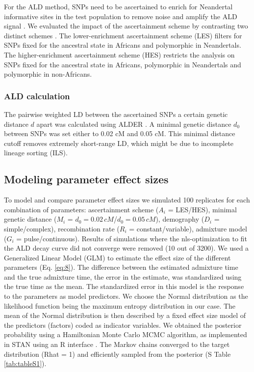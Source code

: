 \documentclass[]{article}
\begin{document}
For the ALD method, SNPs need to be ascertained to enrich for
Neandertal informative sites in the test population to remove noise and
amplify the ALD signal \citep{sankararaman_date_2012}. 
We evaluated the impact of the ascertainment scheme by contrasting two distinct schemes \citep{sankararaman_date_2012,fu_genome_2014}. The lower-enrichment
ascertainment scheme (LES) filters for SNPs fixed for the ancestral state in
Africans and polymorphic in Neandertals. The higher-enrichment
ascertainment scheme (HES) restricts the analysis on SNPs fixed for the
ancestral state in Africans, polymorphic in Neandertals and polymorphic
in non-Africans.

\subsubsection{ALD calculation}\label{ALD calculation}

The pairwise weighted LD between the ascertained SNPs a certain genetic
distance \(d\) apart was calculated using ALDER
\citep{loh_inferring_2013}. A minimal genetic distance \(d_0\) between
SNPs was set either to 0.02 cM and 0.05 cM. This minimal distance cutoff
removes extremely short-range LD, which might be due to incomplete lineage sorting (ILS). 


\subsection{Modeling parameter effect sizes}\label{modeling prameter effect sizes}

To model and compare parameter effect sizes we simulated 100
replicates for each combination of
parameters: ascertainment scheme ($A_i$ = LES/HES), minimal genetic distance
($M_i$ = \(d_{0}=0.02\,cM\)/\(d_{0}=0.05\,cM\)), demography ($D_i$ = simple/complex),
recombination rate ($R_i$ = constant/variable), admixture model
($G_i$ = pulse/continuous). Results of simulations where the nls-optimization to
fit the ALD decay curve did not converge were removed (10 out of 3200).
We used a Generalized Linear Model (GLM)  to estimate the effect
size of the different parameters (Eq.
\ref{eq:8}). The difference between the estimated
admixture time and the true admixture time, the error in the estimate,
was standardized using the true time as the mean. The standardized error in this model is the response to the parameters as model
predictors. We choose the Normal distribution as the likelihood function being the maximum entropy distribution in our case. The mean of the Normal distribution is then described by a fixed effect size model of the predictors (factors) coded as indicator variables. We obtained the posterior probability using a Hamiltonian Monte Carlo MCMC algorithm, as implemented in STAN \citep{carpenter_stan_2017} using an R interface \citep{stan_development_team_rstan_2018,mcelreath_statistical_2020}. The Markov chains converged to the target distribution (Rhat = 1) and efficiently sampled from the posterior (S Table \ref{tab:tableS1}).  
\end{document}
